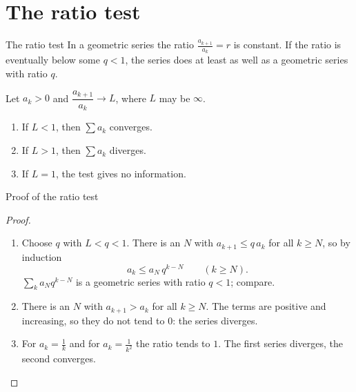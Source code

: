 \documentclass[10pt]{wosm-slides}
\begin{document}
\section{The ratio test}

\begin{frame}{The ratio test}
  In a geometric series the ratio $\frac{a_{k+1}}{a_k} = r$ is constant.
  If the ratio is eventually below some $q < 1$, the series does at least as well as
  a geometric series with ratio $q$.
  \begin{theorem}
    Let $a_k > 0$ and $\dfrac{a_{k+1}}{a_k} \to L$, where $L$ may be $\infty$.
    \begin{enumerate}
      \item If $L < 1$, then $\sum a_k$ converges.
      \item If $L > 1$, then $\sum a_k$ diverges.
      \item If $L = 1$, the test gives no information.
    \end{enumerate}
  \end{theorem}
\end{frame}

\begin{frame}{Proof of the ratio test}
  \begin{proof}
    \begin{enumerate}
      \item Choose $q$ with $L < q < 1$. There is an $N$ with $a_{k+1} \le q\, a_k$ for all
        $k \ge N$, so by induction
        \[ a_k \le a_N\, q^{k-N} \qquad (k \ge N) . \]
        $\sum_k a_N q^{k-N}$ is a geometric series with ratio $q < 1$; compare.
      \item There is an $N$ with $a_{k+1} > a_k$ for all $k \ge N$. The terms are positive
        and increasing, so they do not tend to $0$: the series diverges.
      \item For $a_k = \frac1k$ and for $a_k = \frac{1}{k^2}$ the ratio tends to $1$.
        The first series diverges, the second converges. \qedhere
    \end{enumerate}
  \end{proof}
\end{frame}
\end{document}
